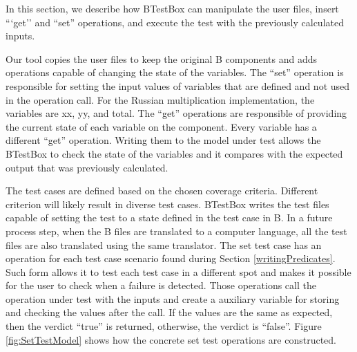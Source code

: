 \documentclass[runningheads]{llncs}
\begin{document}
In this section, we describe how BTestBox can manipulate the user files, insert ```get'' and ``set'' operations, and execute the test with the previously calculated inputs. 

Our tool copies the user files to keep the original B components and adds operations capable of changing the state of the variables. The ``set'' operation is responsible for setting the input values of variables that are defined and not used in the operation call. For the Russian multiplication implementation, the variables are xx, yy, and total. The ``get'' operations are responsible of providing the current state of each variable on the component. Every variable has a different ``get'' operation. Writing them to the model under test allows the BTestBox to check the state of the variables and it compares with the expected output that was previously calculated.

The test cases are defined based on the chosen coverage criteria. Different criterion will likely result in diverse test cases. BTestBox writes the test files capable of setting the test to a state defined in the test case in B. In a future process step, when the B files are translated to a computer language, all the test files are also translated using the same translator. The set test case has an operation for each test case scenario found during Section \ref{writingPredicates}. Such form allows it to test each test case in a different spot and makes it possible for the user to check when a failure is detected. Those operations call the operation under test with the inputs and create a auxiliary variable for storing and checking the values after the call. If the values are the same as expected, then the verdict ``true'' is returned, otherwise, the verdict is ``false''. Figure \ref{fig:SetTestModel} shows how the concrete set test operations are constructed.

        
\end{document}
